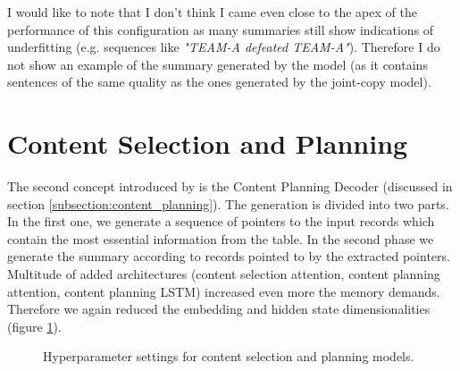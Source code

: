 I would like to note that I don't think I came even close to the apex of the performance of this configuration as many summaries still show indications of underfitting (e.g. sequences like \emph{"TEAM-A defeated TEAM-A"}). Therefore I do not show an example of the summary generated by the model (as it contains sentences of the same quality as the ones generated by the joint-copy model).

\section{Content Selection and Planning} \label{section:experiments_csap}

The second concept introduced by \citep{puduppully2019datatotext} is the Content Planning Decoder (discussed in section \ref{subsection:content_planning}). The generation is divided into two parts. In the first one, we generate a sequence of pointers to the input records which contain the most essential information from the table. In the second phase we generate the summary according to records pointed to by the extracted pointers. Multitude of added architectures (content selection attention, content planning attention, content planning LSTM) increased even more the memory demands. Therefore we again reduced the embedding and hidden state dimensionalities (figure \ref{figure:hyperparameters_content_selection_and_planning}).

\begin{figure}[h]
    \caption{Hyperparameter settings for content selection and planning models.} \label{figure:hyperparameters_content_selection_and_planning}
\end{figure}

